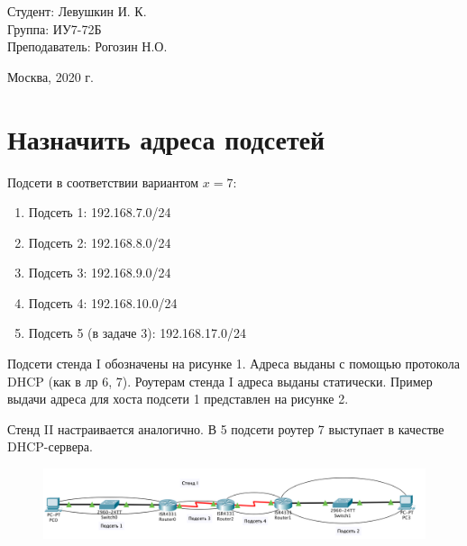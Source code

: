 \documentclass[a4paper,12pt]{article}
\begin{document}
	\large
	\begin{flushright}
		Студент: Левушкин И. К. \\
		Группа: ИУ7-72Б \\
		Преподаватель: Рогозин Н.О. \\
	\end{flushright}
	
	\vspace*{25mm}
	\begin{center}
		Москва, 2020 г.  
	\end{center}
	\thispagestyle{empty}
	
	
	\newpage
	
	\section{Назначить адреса подсетей}
	
	Подсети в соответствии вариантом $x = 7$:
	
	\begin{enumerate}
		\item Подсеть 1: 192.168.7.0/24
		\item Подсеть 2: 192.168.8.0/24
		\item Подсеть 3: 192.168.9.0/24
		\item Подсеть 4: 192.168.10.0/24
		\item Подсеть 5 (в задаче 3): 192.168.17.0/24
	\end{enumerate}

	Подсети стенда I обозначены на рисунке 1. Адреса выданы с помощью
протокола DHCP (как в лр 6, 7). Роутерам стенда I адреса выданы статически.
Пример выдачи адреса для хоста подсети 1 представлен на рисунке 2.

Стенд II настраивается аналогично. В 5 подсети роутер 7 выступает в качестве DHCP-сервера.

	\begin{figure}[h!]
		\begin{center}
			{\includegraphics[width = \textwidth]{img/1.png}}
			\caption{}
			\label{ris:1}
		\end{center}
	\end{figure}

	\newpage
\end{document}
